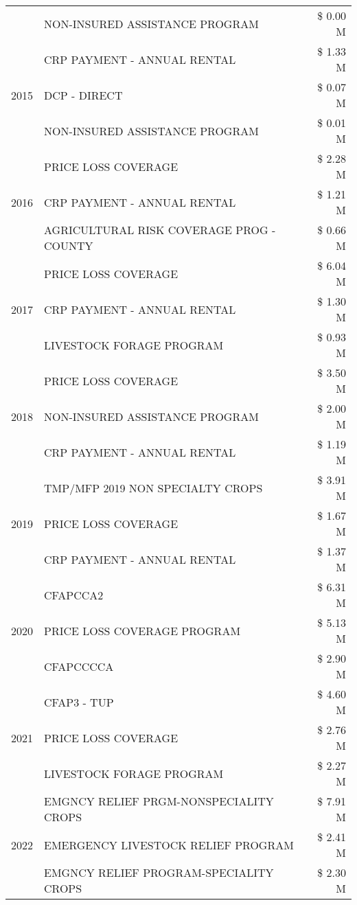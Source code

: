 \begin{tabular}{llr}
 & NON-INSURED ASSISTANCE PROGRAM & \$ 0.00 M \\
\cline{1-3}
\multirow[t]{3}{*}{2015} & CRP PAYMENT - ANNUAL RENTAL & \$ 1.33 M \\
 & DCP - DIRECT & \$ 0.07 M \\
 & NON-INSURED ASSISTANCE PROGRAM & \$ 0.01 M \\
\cline{1-3}
\multirow[t]{3}{*}{2016} & PRICE LOSS COVERAGE & \$ 2.28 M \\
 & CRP PAYMENT - ANNUAL RENTAL & \$ 1.21 M \\
 & AGRICULTURAL RISK COVERAGE PROG - COUNTY & \$ 0.66 M \\
\cline{1-3}
\multirow[t]{3}{*}{2017} & PRICE LOSS COVERAGE & \$ 6.04 M \\
 & CRP PAYMENT - ANNUAL RENTAL & \$ 1.30 M \\
 & LIVESTOCK FORAGE PROGRAM & \$ 0.93 M \\
\cline{1-3}
\multirow[t]{3}{*}{2018} & PRICE LOSS COVERAGE & \$ 3.50 M \\
 & NON-INSURED ASSISTANCE PROGRAM & \$ 2.00 M \\
 & CRP PAYMENT - ANNUAL RENTAL & \$ 1.19 M \\
\cline{1-3}
\multirow[t]{3}{*}{2019} & TMP/MFP 2019 NON SPECIALTY CROPS & \$ 3.91 M \\
 & PRICE LOSS COVERAGE & \$ 1.67 M \\
 & CRP PAYMENT - ANNUAL RENTAL & \$ 1.37 M \\
\cline{1-3}
\multirow[t]{3}{*}{2020} & CFAPCCA2 & \$ 6.31 M \\
 & PRICE LOSS COVERAGE PROGRAM & \$ 5.13 M \\
 & CFAPCCCCA & \$ 2.90 M \\
\cline{1-3}
\multirow[t]{3}{*}{2021} & CFAP3 - TUP & \$ 4.60 M \\
 & PRICE LOSS COVERAGE & \$ 2.76 M \\
 & LIVESTOCK FORAGE PROGRAM & \$ 2.27 M \\
\cline{1-3}
\multirow[t]{3}{*}{2022} & EMGNCY RELIEF PRGM-NONSPECIALITY CROPS & \$ 7.91 M \\
 & EMERGENCY LIVESTOCK RELIEF PROGRAM & \$ 2.41 M \\
 & EMGNCY RELIEF PROGRAM-SPECIALITY CROPS & \$ 2.30 M \\
\cline{1-3}
\bottomrule
\end{tabular}
